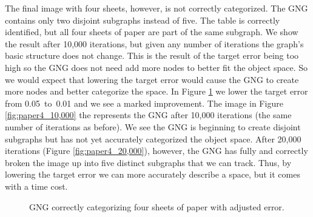 \documentclass{article}
\renewcommand{\|}{\origbar} %
\begin{document}
The final image with four sheets, however, is not correctly categorized. The GNG contains only two disjoint subgraphs instead of five. The table is correctly identified, but all four sheets of paper are part of the same subgraph. We show the result after 10,000 iterations, but given any number of iterations the graph's basic structure does not change. This is the result of the target error being too high so the GNG does not need add more nodes to better fit the object space. So we would expect that lowering the target error would cause the GNG to create more nodes and better categorize the space. In Figure \ref{fig:paper4Lowerror} we lower the target error from 0.05~to~0.01 and we see a marked improvement. The image in Figure \ref{fig:paper4_10,000} the represents the GNG after 10,000 iterations (the same number of iterations as before). We see the GNG is beginning to create disjoint subgraphs but has not yet accurately categorized the object space. After 20,000 iterations (Figure \ref{fig:paper4_20,000}), however, the GNG has fully and correctly broken the image up into five distinct subgraphs that we can track. Thus, by lowering the target error we can more accurately describe a space, but it comes with a time cost. 

\begin{figure}[h!]
  \centering

  \caption{GNG correctly categorizing four sheets of paper with adjusted error.}
  \label{fig:paper4Lowerror}
\end{figure}
\end{document}
